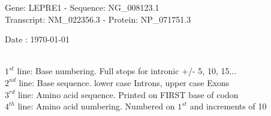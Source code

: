 \documentclass{article}
\begin{document}
\renewcommand{\footrulewidth}{1pt}
\renewcommand{\headrulewidth}{0pt}
\begin{center}
\begin{large}
Gene: LEPRE1 - Sequence: NG\_008123.1\\
Transcript: NM\_022356.3 - Protein: NP\_071751.3
 
 Date : \today\\\\
\end{large}
\end{center}
$1^{st}$ line: Base numbering. Full stops for intronic +/- 5, 10, 15...\\
$2^{nd}$ line: Base sequence. lower case Introns, upper case Exons\\
$3^{rd}$ line: Amino acid sequence. Printed on FIRST base of codon\\
$4^{th}$ line: Amino acid numbering. Numbered on $1^{st}$ and increments of 10\\
\end{document}
